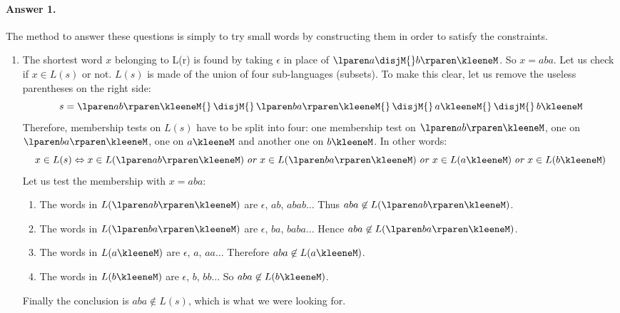 \paragraph{Answer 1.} The method to answer these questions is simply
to try small words by constructing them in order to satisfy the
constraints.
\begin{enumerate}

  \item \label{aba} The shortest word \(x\) belonging to L(r) is found
    by taking \(\epsilon\) in place of \(\lparen a \disjM{}
    b\rparen\kleeneM\). So \(x = aba\). Let us check if \(x \in L(s)\)
    or not. \(L(s)\) is made of the union of four sub-languages
    (subsets). To make this clear, let us remove the useless
    parentheses on the right side:
    \[
    s = \lparen ab \rparen\kleeneM{} \, \disjM{} \, \lparen ba
    \rparen\kleeneM{} \, \disjM{} \, a\kleeneM{} \, \disjM{} \,
    b\kleeneM
    \]
    Therefore, membership tests on \(L(s)\) have to be split into
    four: one membership test on \(\lparen ab \rparen\kleeneM\), one
    on \(\lparen ba \rparen\kleeneM\), one on \(a\kleeneM\) and
    another one on \(b\kleeneM\). In other words:
    \[
     x \in L(s) \Leftrightarrow x \in L(\lparen ab \rparen\kleeneM) \;
     \text{\emph{or}} \; x \in L(\lparen ba \rparen\kleeneM) \;
     \text{\emph{or}} \; x \in L(a\kleeneM) \; \text{\emph{or}} \; x
     \in L(b\kleeneM)
    \]
    Let us test the membership with \(x = aba\):
    \begin{enumerate}
  
      \item The words in \(L(\lparen ab \rparen\kleeneM)\) are
        \(\epsilon\), \(ab\), \(abab\ldots\) Thus \(aba \not\in
        L(\lparen ab \rparen\kleeneM)\).

      \item The words in \(L(\lparen ba \rparen\kleeneM)\) are
        \(\epsilon\), \(ba\), \(baba\ldots\) Hence \(aba \not\in
        L(\lparen ba \rparen\kleeneM)\).

      \item The words in \(L(a\kleeneM)\) are \(\epsilon\), \(a\),
        \(aa\ldots\) Therefore \(aba \not\in L(a\kleeneM)\).

      \item The words in \(L(b\kleeneM)\) are \(\epsilon\), \(b\),
        \(bb\ldots\) So \(aba \not\in L(b\kleeneM)\).
  
    \end{enumerate}
    Finally the conclusion is \(aba \not\in L(s)\), which is what we
    were looking for.


\end{enumerate}
